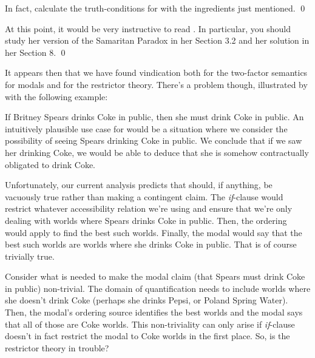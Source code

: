 \begin{exercise}
  In fact, calculate the truth-conditions for \Last with the ingredients just
  mentioned. \qed
\end{exercise}

\begin{exercise}
  At this point, it would be very instructive to read
  \cite{kratzer-1991-modality}. In particular, you should study her version of
  the Samaritan Paradox in her Section 3.2 and her solution in her Section 8.
  \qed
\end{exercise}

%
It appears then that we have found vindication both for the two-factor semantics
for modals and for the restrictor theory. There's a problem though, illustrated
by \cite{zvolenszky-2002-problem} with the following example:

%
%
\ex If Britney Spears drinks Coke in public, then she must drink Coke in public.
\xe
An intuitively plausible use case for \Last would be a situation where we
consider the possibility of seeing Spears drinking Coke in public. We conclude
that if we saw her drinking Coke, we would be able to deduce that she is somehow
contractually obligated to drink Coke.

Unfortunately, our current analysis predicts that \Last should, if anything, be
vacuously true rather than making a contingent claim. The \emph{if}-clause would
restrict whatever accessibility relation we're using and ensure that we're only
dealing with worlds where Spears drinks Coke in public. Then, the ordering would
apply to find the best such worlds. Finally, the modal would say that the best
such worlds are worlds where she drinks Coke in public. That is of course
trivially true.

Consider what is needed to make the modal claim (that Spears must drink Coke in
public) non-trivial. The domain of quantification needs to include worlds where
she doesn't drink Coke (perhaps she drinks Pepsi, or Poland Spring Water). Then,
the modal's ordering source identifies the best worlds and the modal says that
all of those are Coke worlds. This non-triviality can only arise if
\emph{if}-clause doesn't in fact restrict the modal to Coke worlds in the first
place. So, is the restrictor theory in trouble?

